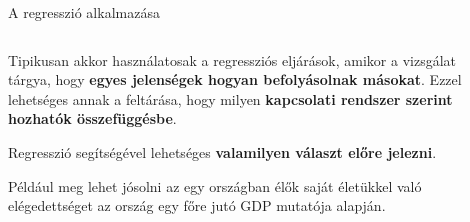 \documentclass[english, aspectratio=169]{beamer}
\begin{document}
\begin{frame}{A regresszió alkalmazása}
\begin{columns}
\begin{column}{.5\textwidth}
Tipikusan akkor használatosak a regressziós eljárások, amikor a vizsgálat tárgya, hogy \textbf{egyes jelenségek hogyan befolyásolnak másokat}. Ezzel lehetséges annak a feltárása, hogy milyen \textbf{kapcsolati rendszer szerint hozhatók összefüggésbe}.\par\smallskip
Regresszió segítségével lehetséges \textbf{valamilyen választ előre jelezni}.\par\smallskip
Például meg lehet jósolni az egy országban élők saját életükkel való elégedettséget az ország egy főre jutó GDP mutatója alapján. 
\end{column}
\begin{column}{.5\textwidth}
\end{column}
\end{columns}
\end{frame}
\end{document}
